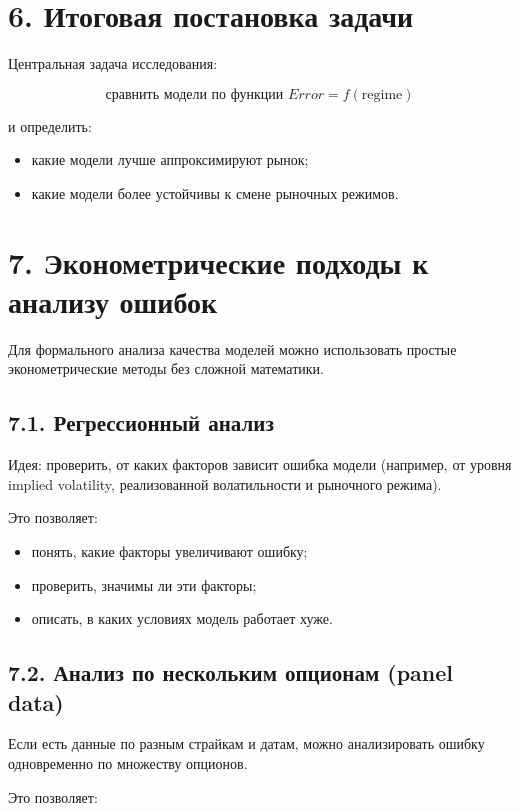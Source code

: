 \documentclass[12pt]{article}
\begin{document}
\section*{6. Итоговая постановка задачи}

Центральная задача исследования:

\[
\text{сравнить модели по функции } Error = f(\text{regime})
\]

и определить:

\begin{itemize}
    \item какие модели лучше аппроксимируют рынок;
    \item какие модели более устойчивы к смене рыночных режимов.
\end{itemize}

\section*{7. Эконометрические подходы к анализу ошибок}

Для формального анализа качества моделей можно использовать простые эконометрические методы без сложной математики.

\subsection*{7.1. Регрессионный анализ}

Идея: проверить, от каких факторов зависит ошибка модели (например, от уровня implied volatility, реализованной волатильности и рыночного режима).

Это позволяет:

\begin{itemize}
    \item понять, какие факторы увеличивают ошибку;
    \item проверить, значимы ли эти факторы;
    \item описать, в каких условиях модель работает хуже.
\end{itemize}

\subsection*{7.2. Анализ по нескольким опционам (panel data)}

Если есть данные по разным страйкам и датам, можно анализировать ошибку одновременно по множеству опционов.

Это позволяет:
\end{document}
